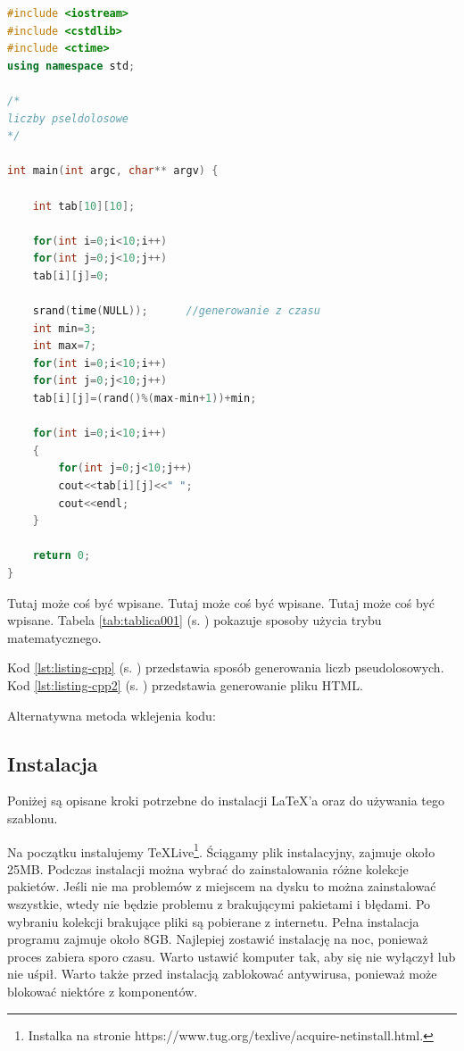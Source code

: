 \begin{lstlisting}[caption=Przykładowy kod 001, label={lst:listing-cpp}, language=C++]
#include <iostream>
#include <cstdlib>
#include <ctime>
using namespace std;

/*
liczby pseldolosowe
*/

int main(int argc, char** argv) {
	
	int tab[10][10];
	
	for(int i=0;i<10;i++)
	for(int j=0;j<10;j++)
	tab[i][j]=0;
	
	srand(time(NULL));		//generowanie z czasu
	int min=3;
	int max=7;
	for(int i=0;i<10;i++)
	for(int j=0;j<10;j++)		
	tab[i][j]=(rand()%(max-min+1))+min;	
	
	for(int i=0;i<10;i++)
	{
		for(int j=0;j<10;j++)
		cout<<tab[i][j]<<" ";	
		cout<<endl;
	}
	
	return 0;
}
\end{lstlisting}

Tutaj może coś być wpisane. Tutaj może coś być wpisane. Tutaj może coś być wpisane. Tabela \ref{tab:tablica001} (s. \pageref{tab:tablica001}) pokazuje sposoby użycia trybu matematycznego.

Kod \ref{lst:listing-cpp} (s. \pageref{lst:listing-cpp}) przedstawia sposób generowania liczb pseudolosowych. Kod \ref{lst:listing-cpp2} (s. \pageref{lst:listing-cpp2}) przedstawia generowanie pliku HTML.

Alternatywna metoda wklejenia kodu:




\subsection{Instalacja}  %

\hspace{0.60cm}Poniżej są opisane kroki potrzebne do instalacji \LaTeX 'a oraz do używania tego szablonu.

Na początku instalujemy \TeX{}Live\footnote{Instalka na stronie  https://www.tug.org/texlive/acquire-netinstall.html\cite{www2}.}. Ściągamy plik instalacyjny, zajmuje około 25MB. Podczas instalacji można wybrać do zainstalowania różne kolekcje pakietów. Jeśli nie ma problemów z miejscem na dysku to można zainstalować wszystkie, wtedy nie będzie problemu z brakującymi pakietami i błędami. Po wybraniu kolekcji brakujące pliki są pobierane z internetu. Pełna instalacja programu zajmuje około 8GB. Najlepiej zostawić instalację na noc, ponieważ proces zabiera sporo czasu. Warto ustawić komputer tak, aby się nie wyłączył lub nie uśpił. Warto także przed instalacją zablokować antywirusa, ponieważ może blokować niektóre z komponentów.

